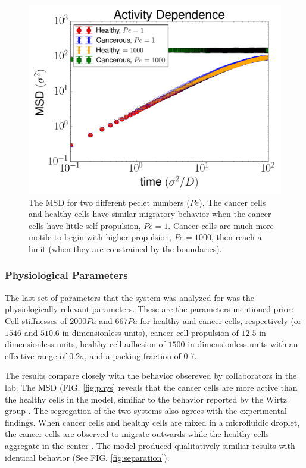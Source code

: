 \documentclass[aps,prb,twocolumn,groupedaddress,nofootinbib,floatfix]{revtex4}
\begin{document}
\begin{figure}
    \includegraphics[width=1.0\columnwidth]{images/pe_both.png}
  \caption{The MSD for two different peclet numbers ($Pe$). The cancer cells and healthy cells have similar migratory behavior when the cancer cells have little self propulsion, $Pe=1$. Cancer cells are much more motile to begin with higher propulsion, $Pe=1000$, then reach a limit (when they are constrained by the boundaries).}
  \label{fig:prop}
\end{figure}


\subsubsection{Physiological Parameters}

The last set of parameters that the system was analyzed for was the physiologically relevant parameters.
These are the parameters mentioned prior: Cell stiffnesses of $2000Pa$ and $667Pa$ for healthy and cancer cells, respectively (or $1546$ and $510.6$ in dimensionless units), cancer cell propulsion of $12.5$ in dimensionless units, healthy cell adhesion of $1500$ in dimensionless units with an effective range of $0.2\sigma$, and a packing fraction of $0.7$.

The results compare closely with the behavior obsereved by collaborators in the lab.
The MSD (FIG. \ref{fig:phys} reveals that the cancer cells are more active than the healthy cells in the model, similiar to the behavior reported by the Wirtz group \cite{Lee}.
The segregation of the two systems also agrees with the experimental findings.
When cancer cells and healthy cells are mixed in a microfluidic droplet, the cancer cells are observed to migrate outwards while the healthy cells aggregate in the center \cite{Lu}.
The model produced qualitatively similiar results with identical behavior (See FIG. \ref{fig:separation}).
\end{document}
